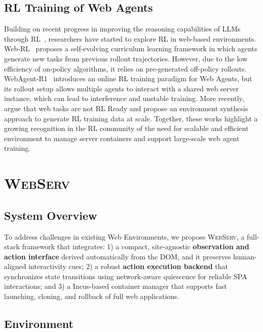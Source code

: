 \documentclass{article}
\DeclareRobustCommand{\projectname}{\textsc{WebServ}\xspace}
\begin{document}
\subsection{RL Training of Web Agents}
Building on recent progress in improving the reasoning capabilities of LLMs through RL~\cite{deepseek-aiDeepSeekR1IncentivizingReasoning2025}, researchers have started to explore RL in web-based environments.
Web-RL~\cite{qiWebRLTrainingLLM2025} proposes a self-evolving curriculum learning framework in which agents generate new tasks from previous rollout trajectories. However, due to the low efficiency of on-policy algorithms, it relies on pre-generated off-policy rollouts.
WebAgent-R1~\cite{weiWebAgentR1TrainingWeb2025} introduces an online RL training paradigm for Web Agents, but its rollout setup allows multiple agents to interact with a shared web server instance, which can lead to interference and unstable training.
More recently, \citet{chenScalingAgentLearning2025} argue that web tasks are not RL Ready and propose an environment synthesis approach to generate RL training data at scale.
Together, these works highlight a growing recognition in the RL community of the need for scalable and efficient environment to manage server containers and support large-scale web agent training.



\section{\projectname}

\subsection{System Overview}
To address challenges in existing Web Environments, we propose \projectname, a full-stack framework that integrates: 1) a compact, site-agnostic \textbf{observation and action interface} derived automatically from the DOM, and it preserves human-aligned interactivity cues; 2) a robust \textbf{action execution backend} that synchronizes state transitions using network-aware quiescence for reliable SPA interactions; and 3) a Incus-based container manager that supports fast launching, cloning, and rollback of full web applications.


\subsection{Environment}
\end{document}
